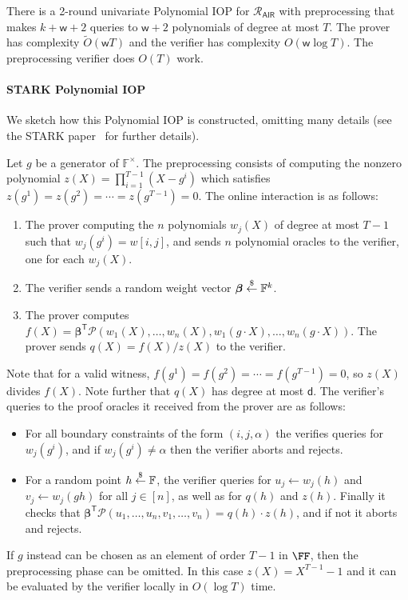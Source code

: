 \begin{theorem}
There is a 2-round univariate Polynomial IOP for $\mathcal{R}_\mathsf{AIR}$ with preprocessing that makes $k+\mathsf{w}+2$ queries to $\mathsf{w}+2$ polynomials of degree at most $T$. The prover has complexity $\tilde{O}(\mathsf{w}T)$ and the verifier has complexity $O(\mathsf{w} \log T)$. The preprocessing verifier does $O(T)$ work.
\end{theorem}


\paragraph{\textsf{STARK} Polynomial IOP} We sketch how this Polynomial IOP is constructed, omitting many details (see the \textsf{STARK} paper~\cite{C:BBHR19} for further details).

Let $g$ be a generator of $\mathbb{F}^\times$. The preprocessing consists of computing the nonzero polynomial $z(X) = \prod_{i=1}^{T-1} (X-g^i)$ which satisfies $z(g^1) = z(g^2) = \cdots = z(g^{T-1}) = 0$. The online interaction is as follows: 
\begin{enumerate} 
\item The prover computing the $n$ polynomials $w_j(X)$ of degree at most $T-1$ such that $w_j(g^i) = w[i,j]$, and sends $n$ polynomial oracles to the verifier, one for each $w_j(X)$. 
\item The verifier sends a random weight vector $\boldsymbol{\beta} \overset{\$}{\gets} \mathbb{F}^k$.
\item  The prover computes $f(X) = \boldsymbol{\beta}^\mathsf{T} \boldsymbol{\mathcal{P}}(w_1(X), \ldots, w_n(X), w_1(g \cdot X), \ldots, w_n(g \cdot X))$. The prover sends $q(X) = f(X)/z(X)$ to the verifier.

\end{enumerate}

  Note that for a valid witness, $f(g^1) = f(g^2) = \cdots = f(g^{T-1}) = 0$, so $z(X)$ divides $f(X)$. Note further that $q(X)$ has degree at most $\mathsf{d}$. The verifier's queries to the proof oracles it received from the prover are as follows:
\begin{itemize}
    \item For all boundary constraints of the form $(i, j, \alpha)$ the verifies queries for $w_j(g^i)$, and if $w_j(g^i) \neq \alpha$ then the verifier aborts and rejects. %
    \item For a random point $h \overset{\$}{\gets} \mathbb{F}$, the verifier queries for $u_j \leftarrow w_j(h)$ and $v_j \leftarrow w_j(gh)$ for all $j \in [n]$, as well as for $q(h)$ and $z(h)$. %
    Finally it checks that $\boldsymbol{\beta}^\mathsf{T} \boldsymbol{\mathcal{P}}(u_1, \ldots, u_n, v_1, \ldots, v_n) = q(h) \cdot z(h)$, and if not it aborts and rejects.
\end{itemize}
If $g$ instead can be chosen as an element of order $T-1$ in $\FF$, then the preprocessing phase can be omitted. In this case $z(X) = X^{T-1} - 1$ and it can be evaluated by the verifier locally in $O(\log T)$ time.

